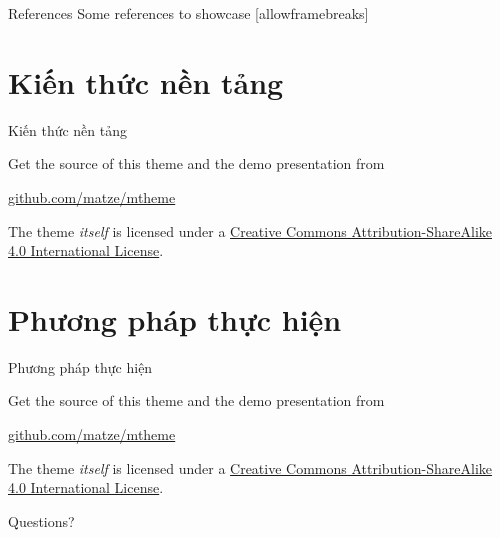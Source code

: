 \documentclass[10pt]{beamer}
\begin{document}
\begin{frame}{References}
  Some references to showcase [allowframebreaks] \cite{durand2003loglog, flajolet2007hyperloglog, chabchoub2010sliding, ertl2024exaloglog, heule2013hyperloglog}
\end{frame}

\section{Kiến thức nền tảng}

\begin{frame}{Kiến thức nền tảng}

  Get the source of this theme and the demo presentation from

  \begin{center}\url{github.com/matze/mtheme}\end{center}

  The theme \emph{itself} is licensed under a
  \href{http://creativecommons.org/licenses/by-sa/4.0/}{Creative Commons
  Attribution-ShareAlike 4.0 International License}.

  \begin{center}\ccbysa\end{center}

\end{frame}

\section{Phương pháp thực hiện}

\begin{frame}{Phương pháp thực hiện}

  Get the source of this theme and the demo presentation from

  \begin{center}\url{github.com/matze/mtheme}\end{center}

  The theme \emph{itself} is licensed under a
  \href{http://creativecommons.org/licenses/by-sa/4.0/}{Creative Commons
  Attribution-ShareAlike 4.0 International License}.

  \begin{center}\ccbysa\end{center}

\end{frame}

\begin{frame}[standout]
  Questions?
\end{frame}
\end{document}
